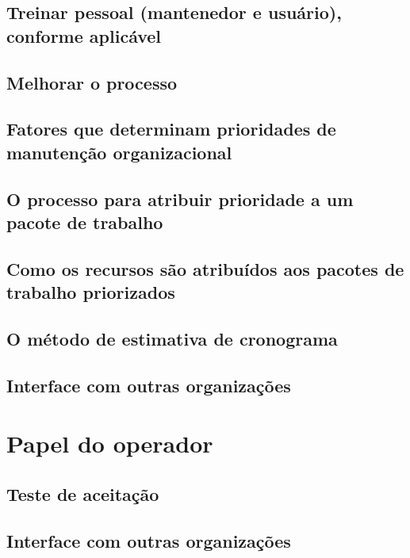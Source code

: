 \subsection{Treinar pessoal (mantenedor e usuário), conforme aplicável}

\subsection{Melhorar o processo}

\subsection{Fatores que determinam prioridades de manutenção organizacional}

\subsection{O processo para atribuir prioridade a um pacote de trabalho }

\subsection{Como os recursos são atribuídos aos pacotes de trabalho priorizados}

\subsection{O método de estimativa de cronograma}

\subsection{Interface com outras organizações}

\section{Papel do operador}

\subsection{Teste de aceitação}

\subsection{Interface com outras organizações}

